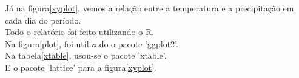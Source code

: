 \documentclass[a4paper]{article}
\begin{document}
Já na figura\ref{xyplot}, vemos a relação entre a temperatura e a precipitação em cada dia
do período.\\

Todo o relatório foi feito utilizando o R.\citep{r}\\

Na figura\ref{plot}, foi utilizado o pacote 'ggplot2'.\citep{ggplot2}\\

Na tabela\ref{xtable}, usou-se o pacote 'xtable'.\citep{xtable}\\

E o pacote 'lattice'\citet{lattice} para a figura\ref{xyplot}.\\



\end{document}
